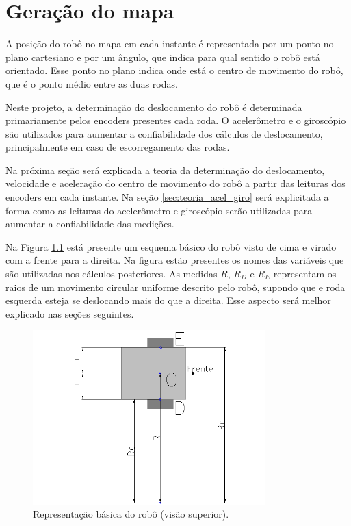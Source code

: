 \chapter{Geração do mapa}

A posição do robô no mapa em cada instante é representada por um ponto no plano cartesiano e por um ângulo, que indica para qual sentido o robô está orientado. Esse ponto no plano indica onde está o centro de movimento do robô, que é o ponto médio entre as duas rodas.

Neste projeto, a determinação do deslocamento do robô é determinada primariamente pelos encoders presentes cada roda. O acelerômetro e o giroscópio são utilizados para aumentar a confiabilidade dos cálculos de deslocamento, principalmente em caso de escorregamento das rodas.

Na próxima seção será explicada a teoria da determinação do deslocamento, velocidade e aceleração do centro de movimento do robô a partir das leituras dos encoders em cada instante. Na seção \ref{sec:teoria_acel_giro} será explicitada a forma como as leituras do acelerômetro e giroscópio serão utilizadas para aumentar a confiabilidade das medições.

Na Figura \ref{fig:robo} está presente um esquema básico do robô visto de cima e virado com a frente para a direita. Na figura estão presentes os nomes das variáveis que são utilizadas nos cálculos posteriores. As medidas $R$, $R_D$ e $R_E$ representam os raios de um movimento circular uniforme descrito pelo robô, supondo que e roda esquerda esteja se deslocando mais do que a direita. Esse aspecto será melhor explicado nas seções seguintes. 

\begin{figure}[H]
  \centering
  \includegraphics[width=0.8\textwidth, keepaspectratio]{./figuras/robo/robo.png}
  \caption{Representação básica do robô (visão superior).}
  \label{fig:robo}
\end{figure}

